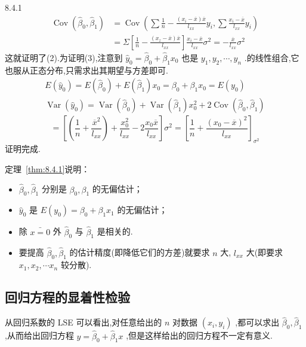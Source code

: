 \begin{theorem}{}{8.4.1}
	\[
	\begin{aligned} \operatorname{Cov}\left(\hat{\beta}_{0}, \hat{\beta}_{1}\right) &=\operatorname{Cov}\left(\sum \frac{1}{n}-\frac{\left(x_{i}-\overline{x}\right) \overline{x}}{l_{x x}} y_{i}, \sum \frac{x_{i}-\overline{x}}{l_{x x}} y_{i}\right) \\ &=\Sigma\left[\frac{1}{n}-\frac{\left(x_{z}-\overline{x}\right) \overline{x}}{l_{x x}}\right] \frac{x_{i}-\overline{x}}{l_{x x}} \sigma^{2}=-\frac{\overline{x}}{l_{x x}} \sigma^{2} \end{aligned}
	\]
	这就证明了(2).为证明(3),注意到 $ \hat{y}_0=\hat{\beta}_0+\hat{\beta}_1x_0  $ 也是 $ y_1,y_2,\cdots,y_n  $ .的线性组合,它也服从正态分布,只需求出其期望与方差即可.
	\[
	\begin{array}{c}{E\left(\hat{y}_{0}\right)=E\left(\hat{\beta}_{0}\right)+E\left(\hat{\beta}_{1}\right) x_{0}=\beta_{0}+\beta_{1} x_{0}=E\left(y_{0}\right)} \\ {\operatorname{Var}\left(\hat{y}_{0}\right)=\operatorname{Var}\left(\hat{\beta}_{0}\right)+\operatorname{Var}\left(\hat{\beta}_{1}\right) x_{0}^{2}+2 \operatorname{Cov}\left(\hat{\beta}_{0}, \hat{\beta}_{1}\right)}\end{array}
	\]
	\[
	=\left[\left(\frac{1}{n}+\frac{\overline{x}^{2}}{l_{x x}}\right)+\frac{x_{0}^{2}}{l_{x x}}-2 \frac{x_{0} \overline{x}}{l_{x x}}\right] \sigma^{2}=\left[\frac{1}{n}+\frac{\left(x_{0}-\overline{x}\right)^{2}}{l_{x x}}\right]_{\sigma^{2}}
	\]
	证明完成.
\end{theorem}

定理~\ref{thm:8.4.1}说明：
\begin{itemize}
	\item  $ \hat{\beta}_0,\hat{\beta}_1  $ 分别是  $ \beta_0,\beta_1  $ 的无偏估计；
	\item  $ \hat{y}_0  $ 是 $  E\left( y_0 \right) =\beta _0+\beta _1x_1 $ 的无偏估计；
	\item 除 $ \bar{x=0}  $ 外  $ \hat{\beta}_0  $ 与 $ \hat{\beta}_1  $ 是相关的.
	\item 要提高 $ \hat{\beta}_0,\hat{\beta}_1  $ 的估计精度(即降低它们的方差)就要求 $ n  $ 大, $ l_{xx}^{}  $ 大(即要求 $ x_1,x_2,\cdots x_n  $ 较分散).
\end{itemize}
\subsection{回归方程的显着性检验}\label{sub:8.4.4}
从回归系数的 LSE 可以看出,对任意给出的 $ n  $ 对数据 $ (x_i,y_i)  $ ,都可以求出 $ \hat{\beta}_0,\hat{\beta}_1  $ ,从而给出回归方程 $ \widehat{y}=\widehat{\beta }_0+\widehat{\beta }_1x  $ ,但是这样给出的回归方程不一定有意义.

